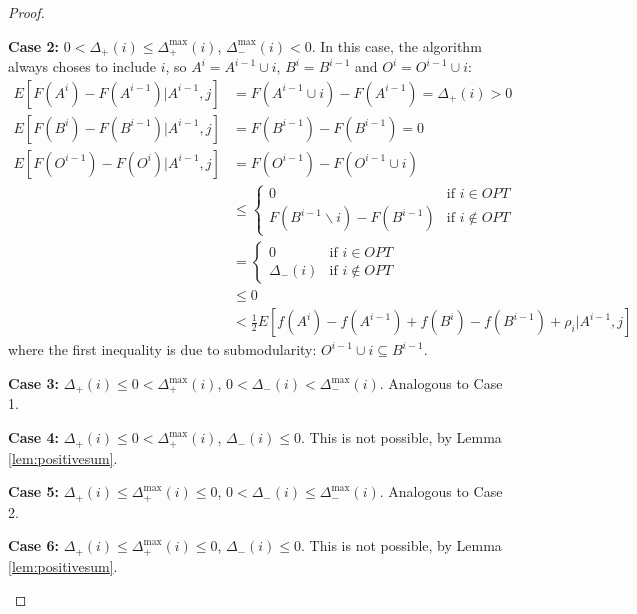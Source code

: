 \begin{proof}
\begin{description}
\item\textbf{Case 2:} $0 < \Delta_+(i) \leq \Delta_+^{\max}(i)$, $\Delta_-^{\max}(i) < 0$.
In this case, the algorithm always choses to include $i$, so $A^i = A^{i-1} \cup i$, $B^i = B^{i-1}$ and $O^i = O^{i-1} \cup i$:
\begin{align*}
E[F(A^i) - F(A^{i-1}) | A^{i-1}, j] &= F(A^{i-1} \cup i) - F(A^{i-1}) = \Delta_+(i) > 0\\
E[F(B^i) - F(B^{i-1}) | A^{i-1}, j] &= F(B^{i-1}) - F(B^{i-1}) = 0\\
E[F(O^{i-1}) - F(O^i) | A^{i-1}, j] &= F(O^{i-1}) - F(O^{i-1} \cup i) \\
&\leq \begin{cases}0 & \text{if $i\in OPT$} \\ F(B^{i-1} \backslash i) - F(B^{i-1}) & \text{if $i\not\in OPT$}\end{cases}\\
&= \begin{cases}0 & \text{if $i\in OPT$} \\ \Delta_-(i) & \text{if $i\not\in OPT$}\end{cases}\\
&\leq 0\\
&< \frac{1}{2} E[f(A^i) - f(A^{i-1}) + f(B^i) - f(B^{i-1}) + \rho_i | A^{i-1},j]
\end{align*}
where the first inequality is due to submodularity: $O^{i-1}\cup i \subseteq B^{i-1}$.


\item\textbf{Case 3:} $\Delta_+(i) \leq 0 < \Delta_+^{\max}(i)$, $0 < \Delta_-(i) < \Delta_-^{\max}(i)$.
Analogous to Case 1.



\item\textbf{Case 4:} $\Delta_+(i) \leq 0 < \Delta_+^{\max}(i)$, $\Delta_-(i) \leq 0$.
This is not possible, by Lemma \ref{lem:positivesum}.

\item\textbf{Case 5:} $\Delta_+(i) \leq \Delta_+^{\max}(i) \leq 0$, $0 < \Delta_-(i) \leq \Delta_-^{\max}(i)$.
Analogous to Case 2.

\item\textbf{Case 6:} $\Delta_+(i) \leq \Delta_+^{\max}(i) \leq 0$, $\Delta_-(i) \leq 0$.
This is not possible, by Lemma \ref{lem:positivesum}.








\end{description}
\end{proof}


